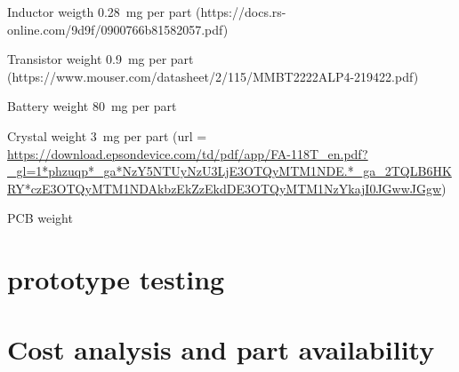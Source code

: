 Inductor weigth 0.28~mg per part
(https://docs.rs-online.com/9d9f/0900766b81582057.pdf)

Transistor weight 0.9~mg per part
(https://www.mouser.com/datasheet/2/115/MMBT2222ALP4-219422.pdf)

Battery weight 80~mg per part
\cite{MicroBatteryMS}

Crystal weight 3~mg per part
(url = {\url{https://download.epsondevice.com/td/pdf/app/FA-118T_en.pdf?_gl=1*phzuqp*_ga*NzY5NTUyNzU3LjE3OTQyMTM1NDE.*_ga_2TQLB6HKRY*czE3OTQyMTM1NDAkbzEkZzEkdDE3OTQyMTM1NzYkajI0JGwwJGgw}})
 
 PCB weight
 
\section{prototype testing}

\section{Cost analysis and part availability}